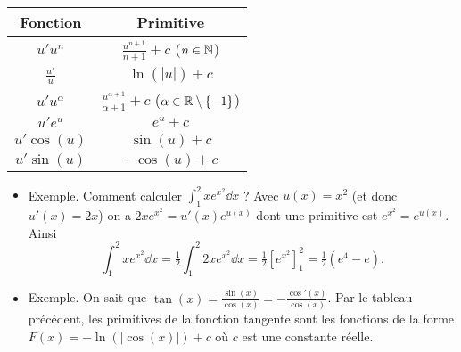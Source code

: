 \documentclass[11pt,class=report,crop=false]{standalone}
\begin{document}
\begin{center}
	\begin{tabular}[t]{|c|c@{\vrule depth 1.2ex height 3ex width 0mm \ }|}
		\hline
		\textbf{Fonction}         & \textbf{Primitive} \\ \hline
		$u'u^n$         & $\frac{u^{n+1}}{n+1}+c$  \quad ($n \in \mathbb{N}$)   \\ \hline
		$\frac{u'}{u}$    & $\ln(|u|)+c$         \\ \hline
		$u'u^\alpha$         & $\frac{u^{\alpha+1}}{\alpha+1}+c$  \quad ($\alpha \in \mathbb{R}\setminus\{-1\}$)   \\ \hline
		$u'e^u$         & $e^u+c$                     \\ \hline
		$u'\cos(u)$      & $\sin(u)+c$                      \\ \hline
		$u'\sin(u)$      & $-\cos(u)+c$                        \\ \hline
	\end{tabular}
\end{center}


\begin{itemize}
   \item Exemple.
   Comment calculer $\int_1^2 x e^{x^2} \dd x$ ? 
   Avec $u(x) = x^2$ (et donc $u'(x)=2x$) on a 
   $2x e^{x^2}  = u'(x)e^{u(x)}$ dont une primitive est $e^{x^2} = e^{u(x)}$.
  Ainsi 
  $$\int_1^2 x e^{x^2} \dd x = \tfrac12\int_1^2 2x e^{x^2} \dd x
  = \tfrac{1}{2}\left[ e^{x^2} \right]_1^2 = \tfrac{1}{2}(e^{4}-e).$$

   \item Exemple.
  On sait que $\tan(x)=\frac{\sin(x)}{\cos(x)}=-\frac{\cos'(x)}{\cos(x)}$. Par le tableau précédent, les primitives de la fonction tangente sont les fonctions de la forme $F(x)=-\ln(|\cos(x)|)+c$ où $c$ est une constante réelle.

\end{itemize}
\end{document}
